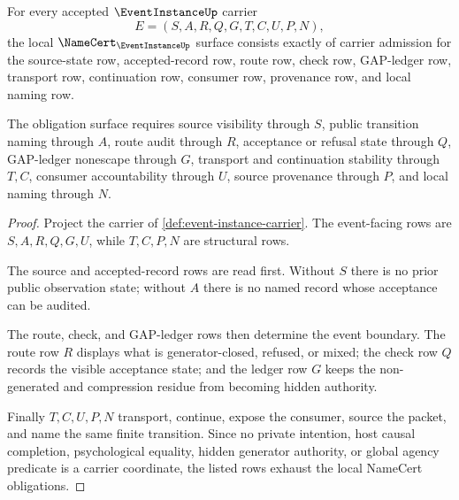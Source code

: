 \begin{theorem}
\label{thm:event-instance-namecert-obligations}
For every accepted $\EventInstanceUp$ carrier
$$
E=(S,A,R,Q,G,T,C,U,P,N),
$$
the local $\NameCert_{\EventInstanceUp}$ surface consists exactly of carrier admission for the source-state row, accepted-record row, route row, check row, GAP-ledger row, transport row, continuation row, consumer row, provenance row, and local naming row.

The obligation surface requires source visibility through $S$, public transition naming through $A$, route audit through $R$, acceptance or refusal state through $Q$, GAP-ledger nonescape through $G$, transport and continuation stability through $T,C$, consumer accountability through $U$, source provenance through $P$, and local naming through $N$.
\end{theorem}
\begin{proof}
Project the carrier of \autoref{def:event-instance-carrier}. The event-facing rows are $S,A,R,Q,G,U$, while $T,C,P,N$ are structural rows.

The source and accepted-record rows are read first. Without $S$ there is no prior public observation state; without $A$ there is no named record whose acceptance can be audited.

The route, check, and GAP-ledger rows then determine the event boundary. The route row $R$ displays what is generator-closed, refused, or mixed; the check row $Q$ records the visible acceptance state; and the ledger row $G$ keeps the non-generated and compression residue from becoming hidden authority.

Finally $T,C,U,P,N$ transport, continue, expose the consumer, source the packet, and name the same finite transition. Since no private intention, host causal completion, psychological equality, hidden generator authority, or global agency predicate is a carrier coordinate, the listed rows exhaust the local NameCert obligations.
\end{proof}

